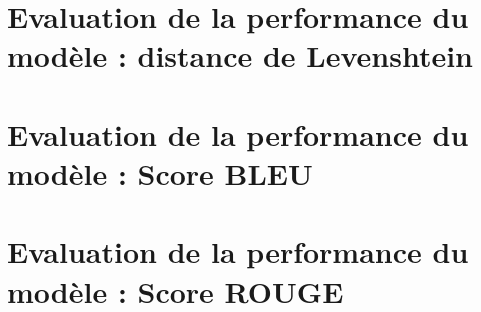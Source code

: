 \documentclass[a4paper,12pt,twoside]{book}
\newcommand{\sautdepage}{\newpage{\pagestyle{empty}\cleardoublepage}}
\begin{document}
        \section{Evaluation de la performance du modèle : distance de Levenshtein}
        
        \clearpage
        \newline
        \section{Evaluation de la performance du modèle : Score BLEU}
        
        \clearpage
        \newline
        \section{Evaluation de la performance du modèle : Score ROUGE}
               

	
\sautdepage



\backmatter
    \printacronyms[title=Liste des acronymes,toctitle=Acronymes, type=\acronymtype] %
    \printglossary %
  \listoffigures %

  \tableofcontents %
	
\end{document}
